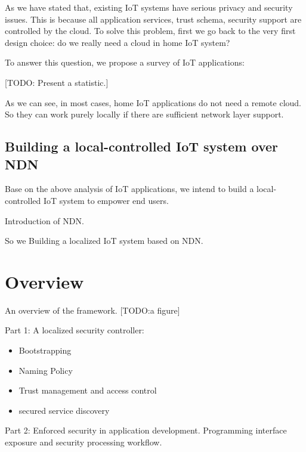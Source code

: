 As we have stated that, existing IoT systems have serious privacy and security issues. This is because all application services, trust schema, security support are controlled by the cloud. To solve this problem, first we go back to the very first design choice: do we really need a cloud in home IoT system?

To answer this question, we propose a survey of IoT applications:

[TODO: Present a statistic.]


As we can see, in most cases, home IoT applications do not need a remote cloud. So they can work purely locally if there are sufficient network layer support. 

\subsection{Building a local-controlled IoT system over NDN}

Base on the above analysis of IoT applications, we intend to build a local-controlled IoT system to empower end users.

Introduction of NDN.

So we Building a localized IoT system based on NDN.

\section{Overview}

An overview of the framework. [TODO:a figure]

Part 1: A localized security controller:
\begin{itemize}
	\item Bootstrapping
	\item Naming Policy
	\item Trust management and access control
	\item secured service discovery
\end{itemize}

Part 2: Enforced security in application development.
Programming interface exposure and security processing workflow.

